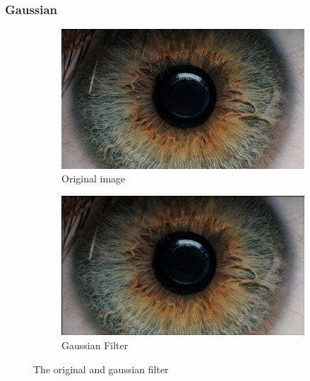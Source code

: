 \documentclass{article}
\begin{document}
\subsubsection{Gaussian}



\begin{figure}[H]
\centering

\begin{subfigure}{.5\textwidth}
  \centering
  \includegraphics[width=0.9\linewidth]{res/index.jpg}
  \caption{Original image}
  \label{fig:original_img}
\end{subfigure}%
\begin{subfigure}{.5\textwidth}
  \centering
  \includegraphics[width=0.9\linewidth]{res/gaussian.jpg}
  \caption{Gaussian Filter}
  \label{fig:gray_img}
\end{subfigure}

\caption{The original and gaussian filter}
\label{fig:result_gauss}
\end{figure}
\end{document}
